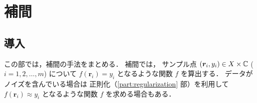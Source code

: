 %

\part{補間}\label{part:interp}

\chapter{導入}

この部では，補間の手法をまとめる．
補間では，
サンプル点 $(\bm{r}_i, y_i) \in X \times \mathbb{C}$ ($i = 1, 2, \ldots, m$) について
$f(\bm{r}_i) = y_i$
となるような関数 $f$ を算出する．
データがノイズを含んでいる場合は
正則化（\ref{part:regularization} 部）を利用して
$f(\bm{r}_i) \approx y_i$
となるような関数 $f$ を求める場合もある．


